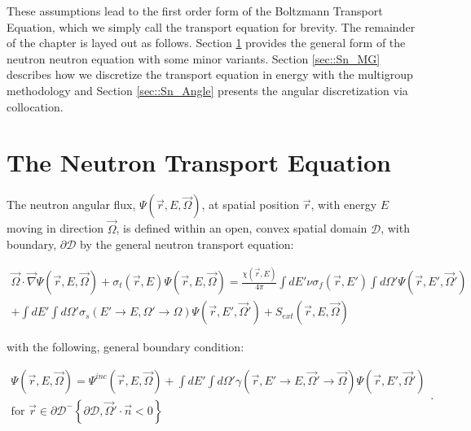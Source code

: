 These assumptions lead to the first order form of the Boltzmann Transport Equation, which we simply call the transport equation for brevity. The remainder of the chapter is layed out as follows. Section \ref{sec::Sn_neut} provides the general form of the neutron neutron equation with some minor variants. Section \ref{sec::Sn_MG} describes how we discretize the transport equation in energy with the multigroup methodology and Section \ref{sec::Sn_Angle} presents the angular discretization via collocation.

\section{The Neutron Transport Equation}
\label{sec::Sn_neut}

The neutron angular flux, $\Psi (\vec{r}, E, \vec{\Omega})$, at spatial position $\vec{r}$, with energy $E$ moving in direction $\vec{\Omega}$, is defined within an open, convex spatial domain $\mathcal{D}$, with boundary, $\partial \mathcal{D}$ by the general neutron transport equation:


\begin{equation}
\label{eq::Sn_transport_eq_full_source}
\begin{aligned}
	\vec{\Omega} \cdot \vec{\nabla} \Psi (\vec{r}, E, \vec{\Omega})+ \sigma_t (\vec{r}, E) \Psi (\vec{r}, E, \vec{\Omega}) = \frac{\chi (\vec{r}, E)}{4 \pi} \int dE' \nu \sigma_f (\vec{r}, E') \int d\Omega' \Psi (\vec{r}, E', \vec{\Omega}') \\ 
	+ \int dE' \int d\Omega' \sigma_s (E' \rightarrow E, \Omega' \rightarrow \Omega) \Psi (\vec{r}, E', \vec{\Omega}') + S_{ext} (\vec{r}, E, \vec{\Omega})
\end{aligned}
\end{equation}

\noindent with the following, general boundary condition:

\begin{equation}
\label{eq::Sn_transport_bc_full}
\begin{aligned}
	\Psi (\vec{r}, E, \vec{\Omega}) = \Psi^{inc} (\vec{r}, E, \vec{\Omega}) + \int dE' \int d\Omega' \gamma (\vec{r}, E' \rightarrow E, \vec{\Omega}' \rightarrow \vec{\Omega}) \Psi (\vec{r}, E', \vec{\Omega}') \\
	\text{for } \vec{r} \in \partial \mathcal{D}^{-} \left\{   \partial \mathcal{D}, \vec{\Omega}' \cdot \vec{n} < 0  \right\}
\end{aligned} .
\end{equation}

